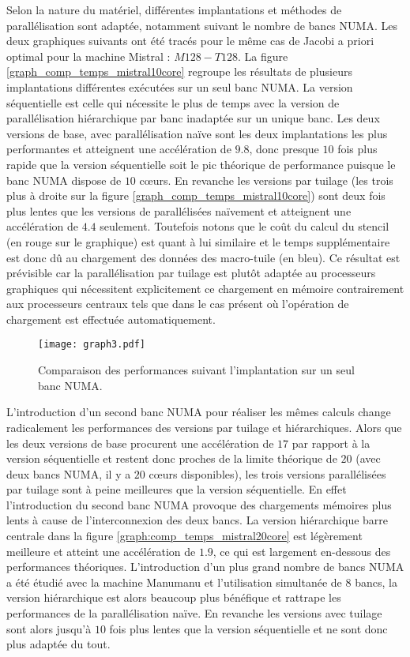 Selon la nature du matériel, différentes implantations et méthodes de parallélisation sont adaptée, notamment suivant le nombre de bancs NUMA. Les deux graphiques suivants ont été tracés pour le même cas de Jacobi a priori optimal pour la machine \textsf{Mistral} : $M128-T128$. La figure \ref{graph_comp_temps_mistral10core} regroupe les résultats de plusieurs implantations différentes exécutées sur un seul banc NUMA. La version séquentielle est celle qui nécessite le plus de temps avec la version de parallélisation hiérarchique par banc inadaptée sur un unique banc. Les deux versions de base, avec parallélisation naïve sont les deux implantations les plus performantes et atteignent une accélération de $9.8$, donc presque $10$ fois plus rapide que la version séquentielle soit le pic théorique de performance puisque le banc NUMA dispose de $10$ cœurs. En revanche les versions par tuilage (les trois plus à droite sur la figure \ref{graph_comp_temps_mistral10core}) sont deux fois plus lentes que les versions de parallélisées naïvement et atteignent une accélération de $4.4$ seulement. Toutefois notons que le coût du calcul du stencil (en rouge sur le graphique) est quant à lui similaire et le temps supplémentaire est donc dû au chargement des données des macro-tuile (en bleu). Ce résultat est prévisible car la parallélisation par tuilage est plutôt adaptée au processeurs graphiques qui nécessitent explicitement ce chargement en mémoire contrairement aux processeurs centraux tels que dans le cas présent où l'opération de chargement est effectuée automatiquement.

\begin{figure}[!h]
  \caption{Comparaison des performances suivant l'implantation sur un seul banc NUMA.}
  \label{graph:comp_temps_mistral10core}
  \texttt{[image: graph3.pdf]}
\end{figure}

L'introduction d'un second banc NUMA pour réaliser les mêmes calculs change radicalement les performances des versions par tuilage et hiérarchiques. Alors que les deux versions de base procurent une accélération de $17$ par rapport à la version séquentielle et restent donc proches de la limite théorique de $20$ (avec deux bancs NUMA, il y a $20$ cœurs disponibles), les trois versions parallélisées par tuilage sont à peine meilleures que la version séquentielle. En effet l'introduction du second banc NUMA provoque des chargements mémoires plus lents à cause de l'interconnexion des deux bancs. La version hiérarchique barre centrale dans la figure \ref{graph:comp_temps_mistral20core} est légèrement meilleure et atteint une accélération de $1.9$, ce qui est largement en-dessous des performances théoriques. L'introduction d'un plus grand nombre de bancs NUMA a été étudié avec la machine \textsf{Manumanu} et l'utilisation simultanée de $8$ bancs, la version hiérarchique est alors beaucoup plus bénéfique et rattrape les performances de la parallélisation naïve. En revanche les versions avec tuilage sont alors jusqu'à $10$ fois plus lentes que la version séquentielle et ne sont donc plus adaptée du tout.

